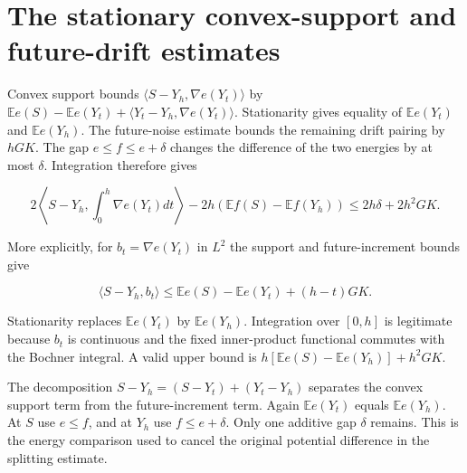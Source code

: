 \documentclass[11pt,a4paper]{article}
\begin{document}
\section{\texorpdfstring{The stationary convex-support and future-drift estimates}{The stationary convex-support and future-drift estimates}}


Convex support bounds \(\langle S-Y_h,\nabla e(Y_t)\rangle\) by \(\mathbb E e(S)-\mathbb E e(Y_t)+\langle Y_t-Y_h,\nabla e(Y_t)\rangle\). Stationarity gives equality of \(\mathbb E e(Y_t)\) and \(\mathbb E e(Y_h)\). The future-noise estimate bounds the remaining drift pairing by \(hGK\). The gap \(e\le f\le e+\delta\) changes the difference of the two energies by at most \(\delta\). Integration therefore gives

\[2\left\langle S-Y_h,\int_0^h\nabla e(Y_t)dt\right\rangle-2h(\mathbb E f(S)-\mathbb E f(Y_h))\le2h\delta+2h^2GK.\]

More explicitly, for \(b_t=\nabla e(Y_t)\) in \(L^2\) the support and future-increment bounds give

\[\langle S-Y_h,b_t\rangle\le\mathbb Ee(S)-\mathbb Ee(Y_t)+(h-t)GK.\]

Stationarity replaces \(\mathbb Ee(Y_t)\) by \(\mathbb Ee(Y_h)\). Integration over \([0,h]\) is legitimate because \(b_t\) is continuous and the fixed inner-product functional commutes with the Bochner integral. A valid upper bound is \(h[\mathbb Ee(S)-\mathbb Ee(Y_h)]+h^2GK\).



The decomposition \(S-Y_h=(S-Y_t)+(Y_t-Y_h)\) separates the convex support term from the future-increment term. Again \(\mathbb E e(Y_t)\) equals \(\mathbb E e(Y_h)\). At \(S\) use \(e\le f\), and at \(Y_h\) use \(f\le e+\delta\). Only one additive gap \(\delta\) remains. This is the energy comparison used to cancel the original potential difference in the splitting estimate.
\end{document}
